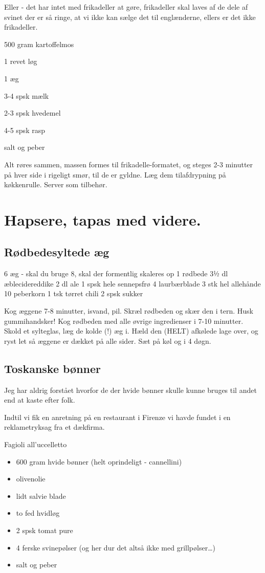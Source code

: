 \documentclass[
]{book}
\providecommand{\tightlist}{%
  \setlength{\itemsep}{0pt}\setlength{\parskip}{0pt}}
\begin{document}
Eller - det har intet med frikadeller at gøre, frikadeller skal laves af de dele af svinet der er så ringe, at vi ikke kan sælge det til englænderne, ellers er det ikke frikadeller.

500 gram kartoffelmos

1 revet løg

1 æg

3-4 spsk mælk

2-3 spsk hvedemel

4-5 spsk rasp

salt og peber

Alt røres sammen, massen formes til frikadelle-formatet, og steges 2-3 minutter på hver side i rigeligt smør, til de er gyldne. Læg dem tilafdrypning på køkkenrulle. Server som tilbehør.

\chapter{Hapsere, tapas med videre.}\label{hapsere-tapas-med-videre.}

\section{Rødbedesyltede æg}\label{ruxf8dbedesyltede-uxe6g}

6 æg - skal du bruge 8, skal der formentlig skaleres op
1 rødbede
3½ dl æblecidereddike
2 dl ale
1 spsk hele sennepsfrø
4 laurbærblade
3 stk hel allehånde
10 peberkorn
1 tsk tørret chili
2 spsk sukker

Kog æggene 7-8 minutter, isvand, pil.
Skræl rødbeden og skær den i tern. Husk gummihandsker!
Kog rødbeden med alle øvrige ingredienser i 7-10 minutter.
Skold et sylteglas, læg de kolde (!) æg i. Hæld den (HELT)
afkølede lage over, og ryst let så æggene er dækket på alle sider.
Sæt på køl og i 4 døgn.

\section{Toskanske bønner}\label{toskanske-buxf8nner}

Jeg har aldrig forstået hvorfor de der hvide bønner skulle kunne bruges til
andet end at kaste efter folk.

Indtil vi fik en anretning på en restaurant i Firenze vi havde fundet i en
reklametryksag fra et dækfirma.

Fagioli all'uccelletto

\begin{itemize}
\tightlist
\item
  600 gram hvide bønner (helt oprindeligt - cannellini)
\item
  olivenolie
\item
  lidt salvie blade
\item
  to fed hvidløg
\item
  2 spsk tomat pure
\item
  4 ferske svinepølser (og her dur det altså ikke med grillpølser\ldots)
\item
  salt og peber
\end{itemize}
\end{document}
